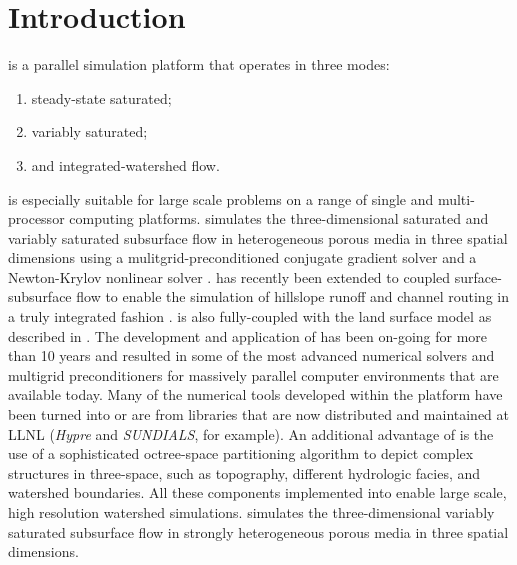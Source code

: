 
\chapter{Introduction}
\label{Introduction}

\parflow{} \cite{Ashby-Falgout90, Jones-Woodward01, KM06} is a parallel simulation platform that operates in three modes:\begin{enumerate}
\item
steady-state saturated; 
\item
variably saturated; 
\item
and integrated-watershed flow.
\end{enumerate}
\parflow{} is especially suitable for large scale problems on a range of single and multi-processor computing platforms. \parflow{} simulates the three-dimensional saturated and variably saturated subsurface flow in heterogeneous porous media in three spatial dimensions using a mulitgrid-preconditioned conjugate gradient solver \cite{Ashby-Falgout90} and a Newton-Krylov nonlinear solver \cite{Jones-Woodward01}. \parflow{} has recently been extended to coupled surface-subsurface flow to enable the simulation of hillslope runoff and channel routing in a truly integrated fashion \cite{KM06}. \parflow{} is also fully-coupled with the land surface model  \cite{Dai03} as described in \cite{MM05,KM08a}.  The development and application of \parflow{} has been on-going for more than 10 years \cite{MK08b, KM08b, KM08a, MK08a, MCT08,MCK07,MWH07,  KM06, MM05, TMCZPS05, MWT03, Teal02, WGM02, Jones-Woodward01, MCT00, TCRM99, TBP99, TFSBA98, Ashby-Falgout90} and resulted in some of the most advanced numerical solvers and multigrid preconditioners for massively parallel computer environments that are available today. Many of the numerical tools developed within the \parflow{} platform have been turned into or are from libraries that are now distributed and maintained at LLNL ({\em Hypre} and {\em SUNDIALS}, for example).   An additional advantage of \parflow{} is the use of a sophisticated octree-space partitioning algorithm to depict complex structures in three-space, such as topography, different hydrologic facies, and watershed boundaries. All these components implemented into \parflow{} enable large scale, high resolution watershed simulations. \parflow{} simulates the three-dimensional variably saturated subsurface flow in strongly heterogeneous porous media in three spatial dimensions.

